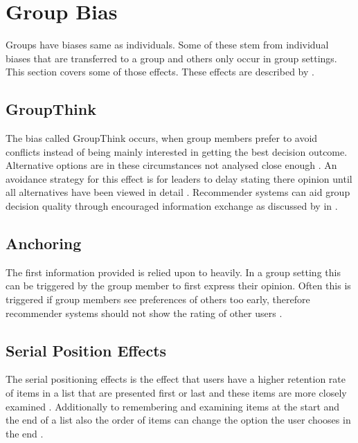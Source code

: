 \section{Group Bias}
\label{sec:Foundations:GroupBias}

Groups have biases same as individuals. Some of these stem from individual biases that are transferred to a group and others only occur in group settings. This section covers some of those effects. These effects are described by \citeauthor{felfernigBiasesGroupDecisions2018} \cite{felfernigBiasesGroupDecisions2018}.

\subsection{GroupThink}

The bias called GroupThink occurs, when group members prefer to avoid conflicts instead of being mainly interested in getting the best decision outcome. Alternative options are in these circumstances not analysed close enough \cite{janis1982groupthink}.
An avoidance strategy for this effect is for leaders to delay stating there opinion until all alternatives have been viewed in detail \citeauthor{felfernigBiasesGroupDecisions2018}. Recommender systems can aid group decision quality through encouraged information exchange as discussed by \citeauthor{atasItemRecommendationUsing2017} in \cite{atasItemRecommendationUsing2017}.


\subsection{Anchoring}

The first information provided is relied upon to heavily. In a group setting this can be triggered by the group member to first express their opinion. Often this is triggered if group members see preferences of others too early, therefore recommender systems should not show the rating of other users \cite{cosley2003seeing}.

\subsection{Serial Position Effects}

The serial positioning effects is the effect that users have a higher retention rate of items in a list that are presented first or last and these items are more closely examined \cite{felfernigPersuasiveRecommendationSerial2007,murphyPrimacyRecencyEffects2006}. Additionally to remembering and examining items at the start and the end of a list also the order of items can change the option the user chooses in the end \cite{felfernigBiasesGroupDecisions2018}.


